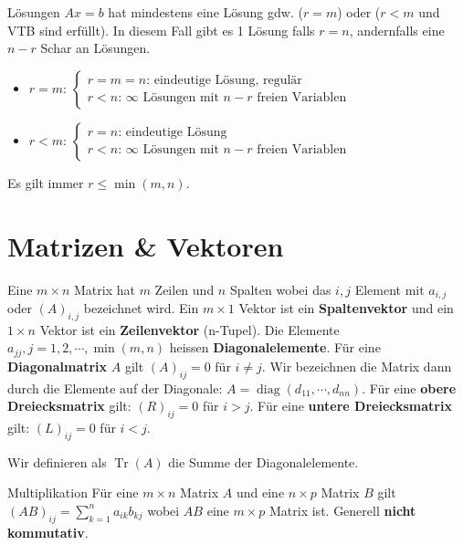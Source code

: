 \documentclass[a4paper,10pt]{article}
\DeclareMathOperator{\Tr}{Tr}
\DeclareMathOperator{\diag}{diag}
\begin{document}
\begin{subbox}{Lösungen}
  $Ax = b$ hat mindestens eine Lösung gdw. ($r = m$) oder ($r < m$ und VTB sind erfüllt). In diesem Fall gibt es 1 Lösung falls $r = n$, andernfalls eine $n - r$ Schar an Lösungen.
  \begin{itemize}
    \item $r = m$: $\begin{cases}
      r = m = n\text{: eindeutige Lösung, regulär}\\
      r < n\text{: }\infty\text{ Lösungen mit } n - r \text{ freien Variablen}
    \end{cases}$\\
    \item $r < m$: $\begin{cases}
      r = n\text{: eindeutige Lösung}\\
      r < n\text{: }\infty\text{ Lösungen mit } n - r \text{ freien Variablen}
    \end{cases}$
  \end{itemize}
\end{subbox}

Es gilt immer $r \leq \min(m, n)$.

\section{Matrizen \& Vektoren}

Eine $m \times n$ Matrix hat $m$ Zeilen und $n$ Spalten wobei das $i,j$ Element mit $a_{i,j}$ oder $(A)_{i,j}$ bezeichnet wird. Ein $m \times 1$ Vektor ist ein \textbf{Spaltenvektor} und ein $1 \times n$ Vektor ist ein \textbf{Zeilenvektor} (n-Tupel). Die Elemente $a_{jj}, j = 1,2,\cdots,\min(m,n)$ heissen \textbf{Diagonalelemente}. Für eine \textbf{Diagonalmatrix} $A$ gilt $(A)_{ij} = 0$ für $i \neq j$. Wir bezeichnen die Matrix dann durch die Elemente auf der Diagonale: $A = \diag(d_{11}, \cdots, d_{nn})$. Für eine \textbf{obere Dreiecksmatrix} gilt: $(R)_{ij} = 0$ für $i > j$. Für eine \textbf{untere Dreiecksmatrix} gilt: $(L)_{ij} = 0$ für $i < j$. 

Wir definieren als $\Tr(A)$ die Summe der Diagonalelemente.

\begin{subbox}{Multiplikation}
  Für eine $m \times n$ Matrix $A$ und eine $n \times p$ Matrix $B$ gilt $(AB)_{ij} = \sum_{k=1}^n a_{ik} b_{kj}$ wobei $AB$ eine $m \times p$ Matrix ist. Generell \textbf{nicht kommutativ}.
\end{subbox}
\end{document}
